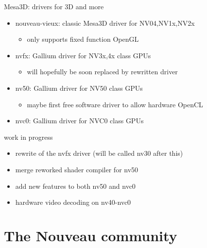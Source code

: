 \documentclass[11pt,english,compress]{beamer}
\begin{document}
		\begin{frame}
			\begin{block}{Mesa3D: drivers for 3D and more}
				\begin{itemize}
					\item nouveau-vieux: classic Mesa3D driver for NV04,NV1x,NV2x
						\begin{itemize}
							\item only supports fixed function OpenGL
						\end{itemize}
					\item nvfx: Gallium driver for NV3x,4x class GPUs
						\begin{itemize}
							\item will hopefully be soon replaced by rewritten driver
						\end{itemize}
					\item nv50: Gallium driver for NV50 class GPUs
						\begin{itemize}
							\item maybe first free software driver to allow hardware OpenCL
						\end{itemize}
					\item nvc0: Gallium driver for NVC0 class GPUs
				\end{itemize}
			\end{block}
			\begin{block}{work in progress}
				\begin{itemize}
					\item rewrite of the nvfx driver (will be called nv30 after this)
					\item merge reworked shader compiler for nv50
					\item add new features to both nv50 and nvc0
					\item hardware video decoding on nv40-nvc0
				\end{itemize}
			\end{block}
		\end{frame}

\section{The Nouveau community}
\end{document}
